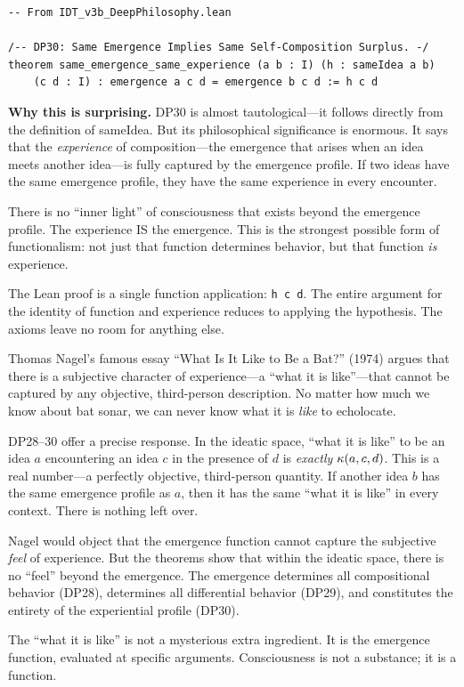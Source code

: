 \begin{lstlisting}
-- From IDT_v3b_DeepPhilosophy.lean

/-- DP30: Same Emergence Implies Same Self-Composition Surplus. -/
theorem same_emergence_same_experience (a b : I) (h : sameIdea a b)
    (c d : I) : emergence a c d = emergence b c d := h c d
\end{lstlisting}

\begin{surprisebox}
\noindent\textbf{Why this is surprising.}
DP30 is almost tautological---it follows directly from the definition
of sameIdea.  But its philosophical significance is enormous.  It says
that the \emph{experience} of composition---the emergence that arises
when an idea meets another idea---is fully captured by the emergence
profile.  If two ideas have the same emergence profile, they have the
same experience in every encounter.

There is no ``inner light'' of consciousness that exists beyond the
emergence profile.  The experience IS the emergence.  This is the
strongest possible form of functionalism: not just that function
determines behavior, but that function \emph{is} experience.

The Lean proof is a single function application: \texttt{h c d}.
The entire argument for the identity of function and experience
reduces to applying the hypothesis.  The axioms leave no room for
anything else.
\end{surprisebox}

\begin{interpretation}
\label{interp:nagels-bat}
Thomas Nagel's famous essay ``What Is It Like to Be a Bat?'' (1974)
argues that there is a subjective character of experience---a ``what
it is like''---that cannot be captured by any objective, third-person
description.  No matter how much we know about bat sonar, we can never
know what it is \emph{like} to echolocate.

DP28--30 offer a precise response.  In the ideatic space, ``what it is
like'' to be an idea $a$ encountering an idea $c$ in the presence of
$d$ is \emph{exactly} $\kappa(a, c, d)$.  This is a real number---a
perfectly objective, third-person quantity.  If another idea $b$ has
the same emergence profile as $a$, then it has the same ``what it is
like'' in every context.  There is nothing left over.

Nagel would object that the emergence function cannot capture the
subjective \emph{feel} of experience.  But the theorems show that
within the ideatic space, there is no ``feel'' beyond the emergence.
The emergence determines all compositional behavior (DP28), determines
all differential behavior (DP29), and constitutes the entirety of
the experiential profile (DP30).

The ``what it is like'' is not a mysterious extra ingredient.  It is
the emergence function, evaluated at specific arguments.  Consciousness
is not a substance; it is a function.
\end{interpretation}

